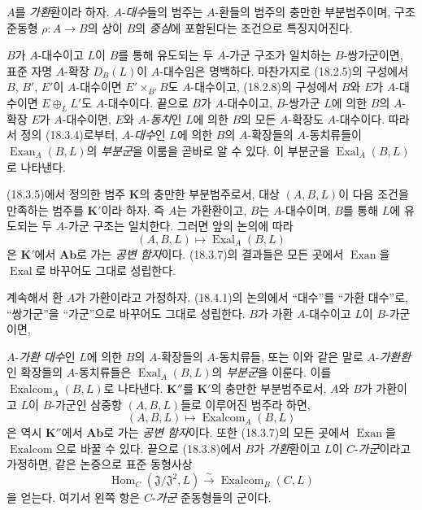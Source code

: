 \begin{env}[18.4.1]
\label{0.18.4.1-fr}
$A$를 \emph{가환}환이라 하자. $A$-\emph{대수}들의 범주는
$A$-환들의 범주의 충만한 부분범주이며, 구조 준동형
$\rho:A\to B$의 상이 $B$의 \emph{중심}에 포함된다는 조건으로
특징지어진다.

$B$가 $A$-대수이고 $L$이 $B$를 통해 유도되는 두 $A$-가군 구조가
일치하는 $B$-쌍가군이면, 표준 자명 $A$-확장 $D_B(L)$이
$A$-대수임은 명백하다. 마찬가지로 (18.2.5)의 구성에서
$B$, $B'$, $E'$이 $A$-대수이면 $E'\times_{B'}B$도 $A$-대수이고,
(18.2.8)의 구성에서 $B$와 $E$가 $A$-대수이면
$E\oplus_LL'$도 $A$-대수이다. 끝으로 $B$가 $A$-대수이고,
$B$-쌍가군 $L$에 의한 $B$의 $A$-확장 $E$가 $A$-대수이면,
$E$와 $A$-\emph{동치}인 $L$에 의한 $B$의 모든 $A$-확장도
$A$-대수이다. 따라서 정의 (18.3.4)로부터, $A$-\emph{대수}인
$L$에 의한 $B$의 $A$-확장들의 $A$-동치류들이
$\operatorname{Exan}_A(B,L)$의 \emph{부분군}을 이룸을 곧바로
알 수 있다. 이 부분군을 $\operatorname{Exal}_A(B,L)$로 나타낸다.

(18.3.5)에서 정의한 범주 $\mathbf K$의 충만한 부분범주로서,
대상 $(A,B,L)$이 다음 조건을 만족하는 범주를 $\mathbf K'$이라 하자.
즉 $A$는 가환환이고, $B$는 $A$-대수이며, $B$를 통해 $L$에
유도되는 두 $A$-가군 구조는 일치한다. 그러면 앞의 논의에 따라
\[
  (A,B,L)\longmapsto\operatorname{Exal}_A(B,L)
\]
은 $\mathbf K'$에서 $\mathbf{Ab}$로 가는 \emph{공변 함자}이다.
(18.3.7)의 결과들은 모든 곳에서 $\operatorname{Exan}$을
$\operatorname{Exal}$로 바꾸어도 그대로 성립한다.
\end{env}

\begin{env}[18.4.2]
\label{0.18.4.2-fr}
계속해서 환 $A$가 가환이라고 가정하자. (18.4.1)의 논의에서
``대수''를 ``가환 대수''로, ``쌍가군''을 ``가군''으로 바꾸어도
그대로 성립한다. $B$가 가환 $A$-대수이고 $L$이 $B$-가군이면,


$A$-\emph{가환 대수}인 $L$에 의한 $B$의 $A$-확장들의
$A$-동치류들, 또는 이와 같은 말로 $A$-\emph{가환환}인 확장들의
$A$-동치류들은 $\operatorname{Exal}_A(B,L)$의 \emph{부분군}을
이룬다. 이를 $\operatorname{Exalcom}_A(B,L)$로 나타낸다.
$\mathbf K''$를 $\mathbf K'$의 충만한 부분범주로서, $A$와 $B$가
가환이고 $L$이 $B$-가군인 삼중항 $(A,B,L)$들로 이루어진 범주라
하면,
\[
  (A,B,L)\longmapsto\operatorname{Exalcom}_A(B,L)
\]
은 역시 $\mathbf K''$에서 $\mathbf{Ab}$로 가는 \emph{공변 함자}이다.
또한 (18.3.7)의 모든 곳에서 $\operatorname{Exan}$을
$\operatorname{Exalcom}$으로 바꿀 수 있다. 끝으로 (18.3.8)에서
$B$가 \emph{가환}환이고 $L$이 $C$-\emph{가군}이라고 가정하면,
같은 논증으로 표준 동형사상
\begin{equation}
\label{0.18.4.2.1-fr}
\tag{18.4.2.1}
  \operatorname{Hom}_C(\mathfrak J/\mathfrak J^2,L)
  \xrightarrow{\sim}\operatorname{Exalcom}_B(C,L)
\end{equation}
을 얻는다. 여기서 왼쪽 항은 $C$-\emph{가군} 준동형들의 군이다.
\end{env}

